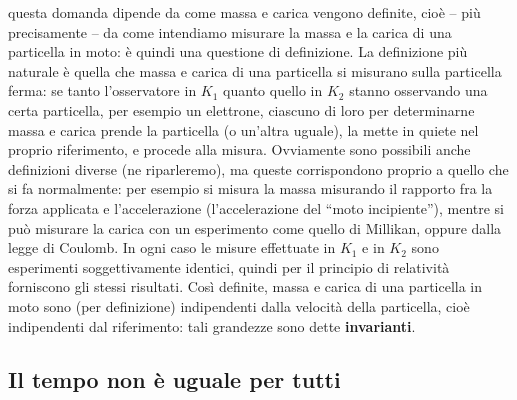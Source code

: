 questa domanda dipende da come massa e carica vengono
definite, cio\`e -- pi\`u precisamente -- da come intendiamo misurare la massa e
la carica di una particella in moto: \`e quindi una questione di definizione. La
definizione pi\`u naturale \`e quella che massa e carica di una particella si
misurano sulla particella ferma: se tanto l'osservatore in $K_1$ quanto quello
in $K_2$ stanno osservando una certa particella, per esempio un elettrone,
ciascuno di loro per determinarne massa e carica prende la particella (o
un'altra uguale), la mette in quiete nel proprio riferimento, e procede alla
misura. Ovviamente sono possibili anche definizioni diverse (ne riparleremo), ma
queste corrispondono proprio a quello che si fa normalmente: per esempio si
misura la massa misurando il rapporto fra la forza applicata e l'accelerazione
(l'accelerazione del ``moto incipiente''), mentre si pu\`o misurare la carica
con un esperimento come quello di Millikan, oppure dalla legge di Coulomb. In
ogni caso le misure effettuate in $K_1$ e in $K_2$ sono esperimenti
soggettivamente identici, quindi per il principio di relativit\`a forniscono gli
stessi risultati. Cos\`i definite, massa e carica di una particella in moto sono
(per definizione) indipendenti dalla velocit\`a della particella, cio\`e
indipendenti dal riferimento: tali grandezze sono dette \textbf{invarianti}.

\subsection{Il tempo non \`e uguale per tutti}

